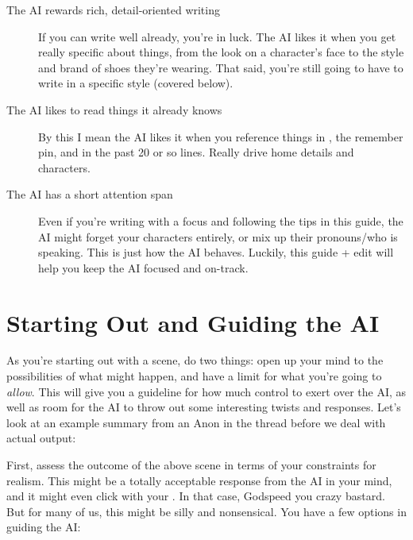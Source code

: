 \documentclass[Avsfag-main.tex]{subfiles}
\begin{document}
\begin{description}

\item[The AI rewards rich, detail-oriented writing]
If you can write well already, you're in luck.
The AI likes it when you get really specific about things, from the look on a character's face to the style and brand of shoes they're wearing.
That said, you're still going to have to write in a specific style (covered below).

\item[The AI likes to read things it already knows]
By this I mean the AI likes it when you reference things in \wi, the remember pin, and in the past 20 or so lines.
Really drive home details and characters.

\item[The AI has a short attention span]
Even if you're writing with a focus and following the tips in this guide, the AI might forget your characters entirely, or mix up their pronouns/who is speaking.
This is just how the AI behaves.
Luckily, this guide + edit will help you keep the AI focused and on-track.

\end{description}

\section{Starting Out and Guiding the AI}

As you're starting out with a scene, do two things: open up your mind to the possibilities of what might happen, and have a limit for what you're
going to \emph{allow}.
This will give you a guideline for how much control to exert over the AI, as well as room for the AI to throw out some interesting twists and responses.
Let's look at an example summary from an Anon in the thread before we deal with actual output:



First, assess the outcome of the above scene in terms of your constraints for realism.
This might be a totally acceptable response from the AI in your mind, and it might even click with your \wi.
In that case, Godspeed you crazy bastard.
But for many of us, this might be silly and nonsensical.
You have a few options in guiding the AI:
\end{document}
